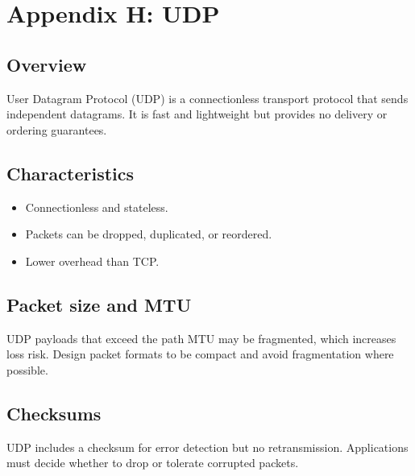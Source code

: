 \documentclass[letterpaper,10pt,english]{sphinxmanual}
\begin{document}
\chapter{Appendix H: UDP}
\label{\detokenize{appendix_h_udp:appendix-h-udp}}\label{\detokenize{appendix_h_udp::doc}}

\section{Overview}
\label{\detokenize{appendix_h_udp:overview}}
\sphinxAtStartPar
User Datagram Protocol (UDP) is a connectionless transport protocol that sends
independent datagrams. It is fast and lightweight but provides no delivery or
ordering guarantees.


\section{Characteristics}
\label{\detokenize{appendix_h_udp:characteristics}}\begin{itemize}
\item {} 
\sphinxAtStartPar
Connectionless and stateless.

\item {} 
\sphinxAtStartPar
Packets can be dropped, duplicated, or reordered.

\item {} 
\sphinxAtStartPar
Lower overhead than TCP.

\end{itemize}


\section{Packet size and MTU}
\label{\detokenize{appendix_h_udp:packet-size-and-mtu}}
\sphinxAtStartPar
UDP payloads that exceed the path MTU may be fragmented, which increases loss
risk. Design packet formats to be compact and avoid fragmentation where
possible.


\section{Checksums}
\label{\detokenize{appendix_h_udp:checksums}}
\sphinxAtStartPar
UDP includes a checksum for error detection but no retransmission. Applications
must decide whether to drop or tolerate corrupted packets.
\end{document}
